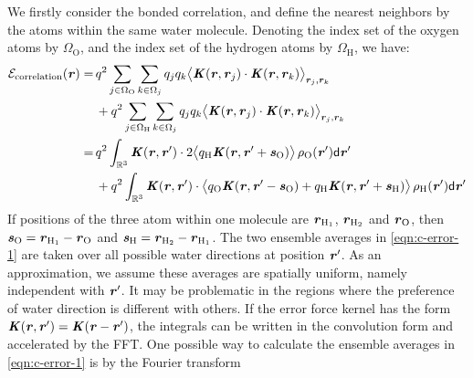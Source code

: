 \documentclass[journal=jacsat,manuscript=article]{achemso}
\newcommand{\redc}[1]{{\color{black} #1}}
\renewcommand{\v}[1]{\textbf{\textit{#1}}}
\renewcommand{\d}[1]{\textsf{#1}}
\begin{document}
We firstly consider the bonded correlation, and define the nearest
neighbors by the atoms within the same water molecule.  Denoting the
index set of the oxygen atoms by $\Omega_{\textrm{O}}$, and the index
set of the hydrogen atoms by $\Omega_{\textrm{H}}$, we have:
\begin{align}\nonumber
  \mathcal E_{\textrm{correlation}}(\v r)
  = &\,
  q^2\sum_{j\in\Omega_{\textrm{O}}}\sum_{k\in\Omega_j}q_jq_k
  \big\langle
  \v K(\v r , \v r_j)\cdot\v K(\v r , \v r_k)
  \big\rangle_{\v r_j,\v r_k} \\ \nonumber
  &\,+ 
  q^2\sum_{j\in\Omega_{\textrm{H}}}\sum_{k\in\Omega_j}q_jq_k
  \big\langle
  \v K(\v r , \v r_j)\cdot\v K(\v r , \v r_k)
  \big\rangle_{\v r_j,\v r_k} \\\nonumber
  = &\,
  q^2
  \int_{\mathbb R^3}
  \v K(\v r , \v r')\cdot
  2\big\langle
  q_{\textrm{H}}\v K(\v r , \v r' + \v s_{\textrm{O}})
  \big\rangle\,
  \rho_{\textrm{O}}(\v r')
  \d d\v r' \\\label{eqn:c-error-1}
  & \,+
  q^2
  \int_{\mathbb R^3}
  \v K(\v r , \v r')\cdot
  \big\langle
  q_{\textrm{O}}\v K(\v r , \v r' - \v s_{\textrm{O}})+
  q_{\textrm{H}}\v K(\v r , \v r' + \v s_{\textrm{H}})
  \big\rangle\,\rho_{\textrm{H}}(\v r')
  \d d\v r'
\end{align}
If positions of the three atom within one molecule are
$\v r_{\textrm{H}_1}$, $\v r_{\textrm{H}_2}$ and $\v r_{\textrm{O}}$, then
$\v s_{\textrm{O}} = \v r_{\textrm{H}_1} - \v r_{\textrm{O}}$ and
$\v s_{\textrm{H}} = \v r_{\textrm{H}_2} - \v r_{\textrm{H}_1}$.
The two ensemble averages in \ref{eqn:c-error-1}
\redc{are} taken over all possible water directions 
at position $\v r'$. As an approximation, we
assume these averages are  spatially uniform, namely independent with $\v r'$.
It may be  problematic
in the regions where the preference of water  direction is different
with others.
If the error force kernel
has the form $\v K(\v r , \v r') = \v K(\v r - \v r')$, 
the integrals can be written in the convolution form and accelerated by the FFT.
One possible way to calculate the ensemble averages in
\ref{eqn:c-error-1} is by the Fourier transform
\end{document}
